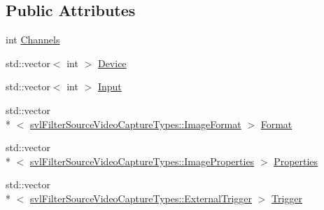 \subsection*{Public Attributes}
\begin{DoxyCompactItemize}
\item 
int \hyperlink{classsvl_filter_source_video_capture_types_1_1_config_ab67c9d24dd0a3390c9614b72481953cb}{Channels}
\item 
std\-::vector$<$ int $>$ \hyperlink{classsvl_filter_source_video_capture_types_1_1_config_aff510fed99ea18174cdec30429959e10}{Device}
\item 
std\-::vector$<$ int $>$ \hyperlink{classsvl_filter_source_video_capture_types_1_1_config_aaf5c493c57a549108677f3b83d75f2cd}{Input}
\item 
std\-::vector\\*
$<$ \hyperlink{classsvl_filter_source_video_capture_types_1_1_image_format}{svl\-Filter\-Source\-Video\-Capture\-Types\-::\-Image\-Format} $>$ \hyperlink{classsvl_filter_source_video_capture_types_1_1_config_a2bc1136b3413c972728318093224f6f0}{Format}
\item 
std\-::vector\\*
$<$ \hyperlink{classsvl_filter_source_video_capture_types_1_1_image_properties}{svl\-Filter\-Source\-Video\-Capture\-Types\-::\-Image\-Properties} $>$ \hyperlink{classsvl_filter_source_video_capture_types_1_1_config_ab5daa0ef70017629bd9936bddd000a42}{Properties}
\item 
std\-::vector\\*
$<$ \hyperlink{classsvl_filter_source_video_capture_types_1_1_external_trigger}{svl\-Filter\-Source\-Video\-Capture\-Types\-::\-External\-Trigger} $>$ \hyperlink{classsvl_filter_source_video_capture_types_1_1_config_a175a2e1c99c02c116b0d8dedf2d28cd9}{Trigger}
\end{DoxyCompactItemize}


